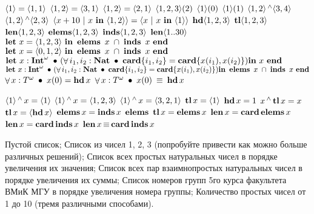 \z $\LL 1 \LR = \LL 1, 1 \LR$
\z $\LL 1, 2 \LR = \LL 3, 1\LR$
\z $\LL 1, 2\LR = \LL 2, 1\LR$
\z $\LL 1, 2, 3 \LR (2)$
\z $\LL 1 \LR (0)$
\z $\LL 1 \LR (1)$
\z $\LL 1, 2\LR \Concat \LL 3, 4\LR$
\z $\LL 1, 2\LR \Concat \LL 2, 3\LR$
\z $\LL x+10~|~x~\In~\LL 1, 2 \LR \LR = \LL x~|~x~\In~\LL 1 \LR \LR$
\z $\Hd \LL 1, 2, 3 \LR$
\z $\Tl \LL 1, 2, 3 \LR$
\z $\Len \LL 1, 2, 3 \LR$
\z $\Elems \LL 1, 2, 3 \LR$
\z $\Inds \LL 1, 2, 3 \LR$
\z $\Len \LL 1..30\LR$
\z $\Let~x = \LL 1, 2, 3\LR~\In~\Elems~x~\Inter~\Inds~x~\rslEnd$
\z $\Let~x = \LL 0, 1, 2\LR~\In~\Elems~x~\Inter~\Inds~x~\rslEnd$
\z $\Let~x : \Int\Inflist~\SuchAs~(\All i_1, i_2: \Nat~\SuchAs~\Card \{i_1, i_2\} = \Card \{x(i_1), x(i_2)\})\\\In~x~\rslEnd$
\z $\Let~x : \Int\Inflist~\SuchAs~(\All i_1, i_2: \Nat~\SuchAs~\Card \{i_1, i_2\} = \Card \{x(i_1), x(i_2)\})\\\In~\Elems~x~\Inter~\Inds~x~\rslEnd$
\z $\All x : T\Inflist~\SuchAs~x(0) = \Hd x$
\z $\All x : T\Inflist~\SuchAs~x(0) ~\Iden~ \Hd x$

\z $\LL 1 \LR \Concat x  = \LL 1 \LR$
\z $\LL 1 \LR \Concat x  = \LL 1, 2, 3 \LR$
\z $\LL 1 \LR \Concat x  = \LL 3, 2, 1 \LR$
\z $\Tl x = \LL 1 \LR$
\z $\Hd x = 1$
\z $x \Concat \Tl x = x$
\z $\Tl x = \LL \Hd x \LR$
\z $\Elems x = \Inds x$
\z $\Elems~\Tl x = \Elems x$
\z $\Len x = \Card \Elems x$
\z $\Len x = \Card \Inds x$
\z $\Len x \Iden \Card \Inds x$



\z Пустой список;
\z Список из чисел 1, 2, 3 (попробуйте привести как можно больше различных решений);
\z Список всех простых натуральных чисел в порядке увеличения их значения;
\z Список всех пар взаимнопростых натуральных чисел в порядке увеличения их суммы;
\z Список номеров групп 5го курса факультета ВМиК МГУ в порядке увеличения номера группы;
\z Количество простых чисел от 1 до 10 (тремя различными способами).

